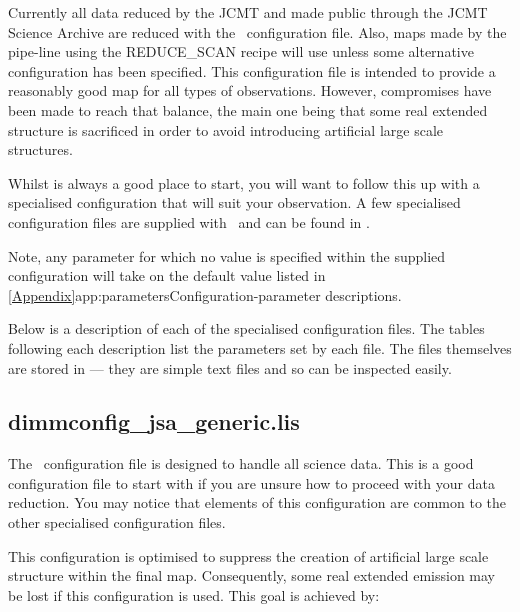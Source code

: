 Currently all data reduced by the JCMT and made public through the JCMT
Science Archive are reduced with the \jsageneric\ configuration file.
Also, maps made by the pipe-line using the
REDUCE\_SCAN recipe will use  unless some
alternative configuration has been specified. This configuration file is
intended to provide a reasonably good map for all types of observations.
However, compromises have been made to reach that balance, the main one
being that some real extended structure is sacrificed in order to avoid
introducing artificial large scale structures.

Whilst  is always a good place to start,
you will want to follow this up with a specialised configuration that will suit
your observation. A few specialised configuration files are supplied with
\smurf\ and can be found in .

Note, any parameter for which no value is specified within the supplied
configuration will take on the default value listed in
\cref{Appendix}{app:parameters}{Configuration-parameter descriptions}.

Below is a description of each of the specialised configuration files.
The tables following each description list the parameters set by each file.
The files themselves are stored in  ---
they are simple text files and so can be inspected easily.

\subsection{dimmconfig\_jsa\_generic.lis}
The \jsageneric\ configuration file is designed to handle all science data. This is a good
configuration file to start with if you are unsure how to proceed with your
data reduction.  You may notice that elements of this configuration are
common to the other specialised configuration files.

This configuration is optimised to suppress the creation of artificial
large scale structure within the final map. Consequently, some real
extended emission may be lost if this configuration is used. This goal is
achieved by:

